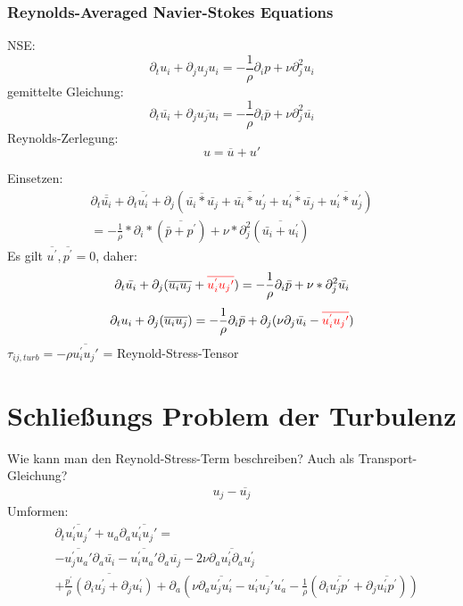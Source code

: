 \documentclass[11pt,t]{beamer}
\newcommand*\mean[1]{\overline{#1}}
\begin{document}
\begin{frame}
\frametitle{Reynolds-Averaged Navier-Stokes Equations}
NSE:
\begin{equation}
\partial_t u_i + \partial_j u_ju_i = -\frac{1}{\rho}\partial_i p + \nu\partial^2_j u_i
\end{equation}
gemittelte Gleichung:
\begin{equation}
\partial_t \overline{u_i} + \partial_j \overline{u_ju_i} = -\frac{1}{\rho}\partial_i \overline{p} + \nu\partial^2_j \overline{u_i}
\end{equation}
Reynolds-Zerlegung:
\begin{equation}
u = \overline{u} + u'
\end{equation}
\end{frame}

\begin{frame}
Einsetzen:
\begin{align}
\partial_t \overline{\bar{u_i}} + \partial_t \overline{u_i^{'}}+ \partial_j (\overline{\bar{u_i}*\bar{u_j}} + \overline{\bar{u_i}*u_j^{'}} + \overline{u_i^{'}*\bar{u_j}} + \overline{u_i^{'}*u_j^{'}}) \\
= - \frac{1}{\rho}*\partial_i*(\overline{\bar{p}+p^{'}}) + \nu*\partial_j^2  (\overline{\bar{u_i}+u_i^{'}})
\end{align}
Es gilt $\overline{u^{'}},\overline{p^{'}} = 0$, daher:
\begin{align}
\partial_t \bar{u_i} + \partial_j (\overline{u_iu_j}+{\color{red}\overline{u_i^{'}u_j{'}}}) = - \frac{1}{\rho} \partial_i \bar{p}+\nu*\partial_j^2\bar{u_i}
\end{align}
\begin{align}
\partial_tu_i+\partial_j(\mean{u_iu_j}) = - \frac{1}{\rho} \partial_i \bar{p}+\partial_j(\nu\partial_j\bar{u_i}-{\color{red}\overline{u_i^{'}u_j{'}}})
\end{align}
$\tau_{ij,turb} = -\rho\overline{u_i^{'}u_j{'}}$ = Reynold-Stress-Tensor
\end{frame}
\section{Schließungs Problem der Turbulenz}
\begin{frame}
Wie kann man den Reynold-Stress-Term beschreiben? Auch als Transport-Gleichung?
\begin{align*}
u_j - \mean{u_j}
\end{align*}
Umformen:
\begin{align*}
&\partial_t\overline{u_i^{'}u_j{'}}+u_a\partial_a\overline{u_i^{'}u_j{'}} =\\& -\overline{u_j^{'}u_a{'}}\partial_a\bar{u_i}
-\overline{u_i^{'}u_a{'}}\partial_a\overline{u_j}- 2\nu\overline{\partial_au_i^{'}\partial_au_j^{'}}\\&+\overline{\frac{p^{'}}{\rho}(\partial_iu_j^{'}+\partial_ju_i^{'})}+\partial_a (\nu\partial_a\overline{u_j^{'}u_i^{'}} -\overline{u_i^{'}u_j{'}u_a^{'}}-\frac{1}{\rho}(\partial_i\overline{u_j^{'}p^{'}}+\partial_j\overline{u_i^{'}p^{'}}))
\end{align*}
\end{frame}
\end{document}
